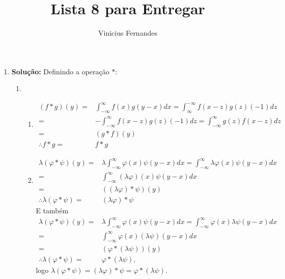 \documentclass{article}
\begin{document}
	
	\title{Lista 8 para Entregar}
	\author{Vinicius Fernandes}
	
	\maketitle
	
	\begin{enumerate}
		
		
		\item \textbf{Solução:} Definindo a operação $*: $ 
			\begin{enumerate}
				\item 
					\begin{enumerate}
						\item 
						$$
						\begin{aligned}
						(f*g)(y) = & \int_{-\infty}^{\infty}f(x)g(y-x)dx =  \int_{\infty}^{-\infty}f(x-z)g(z)(-1)dz
						\\
						=& -\int_{-\infty}^{\infty}f(x-z)g(z)(-1)dz = \int_{-\infty}^{\infty}g(z)f(x-z)dz
						\\
						= & (g*f)(y)
						\\
						\therefore f*g = & f*g
						\end{aligned}
						$$
						
						\item
						$$
						\begin{aligned}
						\lambda(\varphi*\psi)(y) = & \lambda \int_{-\infty}^{\infty}\varphi(x)\psi(y-x)dx = \int_{-\infty}^{\infty}\lambda\varphi(x)\psi(y-x)dx
						\\
						=& \int_{-\infty}^{\infty}(\lambda\varphi)(x)\psi(y-x)dx
						\\
						= & ((\lambda \varphi)*\psi)(y)
						\\
						\therefore \lambda( \varphi*\psi) = & (\lambda \varphi)*\psi
						\end{aligned}
						$$
						E também
						$$
						\begin{aligned}
						\lambda(\varphi*\psi)(y) = & \lambda \int_{-\infty}^{\infty}\varphi(x)\psi(y-x)dx = \int_{-\infty}^{\infty}\varphi(x)\lambda\psi(y-x)dx
						\\
						=& \int_{-\infty}^{\infty}\varphi(x)(\lambda\psi)(y-x)dx
						\\
						= & (\varphi*(\lambda\psi))(y)
						\\
						\therefore \lambda( \varphi*\psi) = & \varphi*(\lambda \psi),
						\end{aligned}
						$$
						logo $\lambda( \varphi*\psi)=(\lambda \varphi)*\psi=\varphi*(\lambda \psi)$.
						

\end{enumerate}
\end{enumerate}
\end{enumerate}
\end{document}
